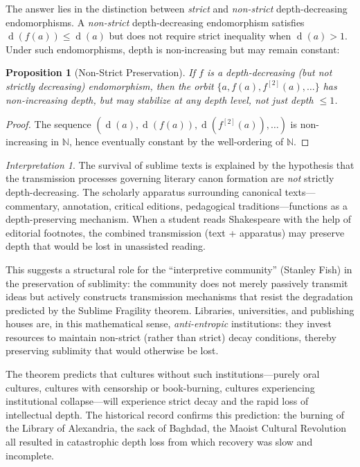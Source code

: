 \documentclass[11pt,openany]{book}
\theoremstyle{definition}
\theoremstyle{plain}
\newtheorem{proposition}[axiom]{Proposition}
\theoremstyle{remark}
\newtheorem{interpretation}[axiom]{Interpretation}
\newcommand{\depth}{\operatorname{d}}       %
\begin{document}
The answer lies in the distinction between \emph{strict} and \emph{non-strict} depth-decreasing endomorphisms. A \emph{non-strict} depth-decreasing endomorphism satisfies $\depth(f(a)) \leq \depth(a)$ but does not require strict inequality when $\depth(a) > 1$. Under such endomorphisms, depth is non-increasing but may remain constant:

\begin{proposition}[Non-Strict Preservation]
If $f$ is a depth-decreasing (but not strictly decreasing) endomorphism, then the orbit $\{a, f(a), f^{[2]}(a), \ldots\}$ has non-increasing depth, but may stabilize at any depth level, not just depth $\leq 1$.
\end{proposition}

\begin{proof}
The sequence $(\depth(a), \depth(f(a)), \depth(f^{[2]}(a)), \ldots)$ is non-increasing in $\mathbb{N}$, hence eventually constant by the well-ordering of $\mathbb{N}$.
\end{proof}

\begin{interpretation}
The survival of sublime texts is explained by the hypothesis that the transmission processes governing literary canon formation are \emph{not} strictly depth-decreasing. The scholarly apparatus surrounding canonical texts---commentary, annotation, critical editions, pedagogical traditions---functions as a depth-preserving mechanism. When a student reads Shakespeare with the help of editorial footnotes, the combined transmission (text + apparatus) may preserve depth that would be lost in unassisted reading.

This suggests a structural role for the ``interpretive community'' (Stanley Fish) in the preservation of sublimity: the community does not merely passively transmit ideas but actively constructs transmission mechanisms that resist the degradation predicted by the Sublime Fragility theorem. Libraries, universities, and publishing houses are, in this mathematical sense, \emph{anti-entropic} institutions: they invest resources to maintain non-strict (rather than strict) decay conditions, thereby preserving sublimity that would otherwise be lost.

The theorem predicts that cultures without such institutions---purely oral cultures, cultures with censorship or book-burning, cultures experiencing institutional collapse---will experience strict decay and the rapid loss of intellectual depth. The historical record confirms this prediction: the burning of the Library of Alexandria, the sack of Baghdad, the Maoist Cultural Revolution all resulted in catastrophic depth loss from which recovery was slow and incomplete.
\end{interpretation}
\end{document}
